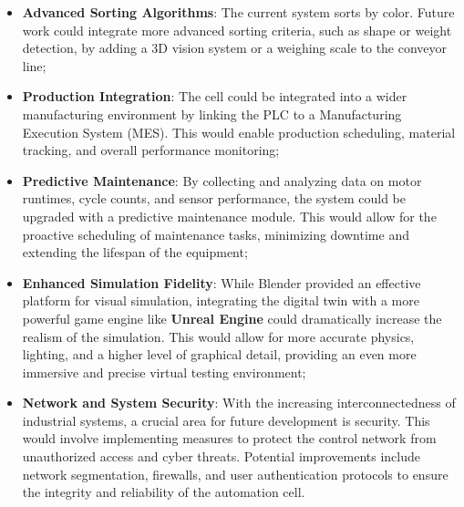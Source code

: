 \begin{itemize}
\item \textbf{Advanced Sorting Algorithms}: The current system sorts by color. Future work could integrate more advanced sorting criteria, such as shape or weight detection, by adding a 3D vision system or a weighing scale to the conveyor line;

\item \textbf{Production Integration}: The cell could be integrated into a wider manufacturing environment by linking the PLC to a Manufacturing Execution System (MES). This would enable production scheduling, material tracking, and overall performance monitoring;

\item \textbf{Predictive Maintenance}: By collecting and analyzing data on motor runtimes, cycle counts, and sensor performance, the system could be upgraded with a predictive maintenance module. This would allow for the proactive scheduling of maintenance tasks, minimizing downtime and extending the lifespan of the equipment;

\item \textbf{Enhanced Simulation Fidelity}: While Blender provided an effective platform for visual simulation, integrating the digital twin with a more powerful game engine like \textbf{Unreal Engine} could dramatically increase the realism of the simulation. This would allow for more accurate physics, lighting, and a higher level of graphical detail, providing an even more immersive and precise virtual testing environment;

\item \textbf{Network and System Security}: With the increasing interconnectedness of industrial systems, a crucial area for future development is security. This would involve implementing measures to protect the control network from unauthorized access and cyber threats. Potential improvements include network segmentation, firewalls, and user authentication protocols to ensure the integrity and reliability of the automation cell.
\end{itemize}

